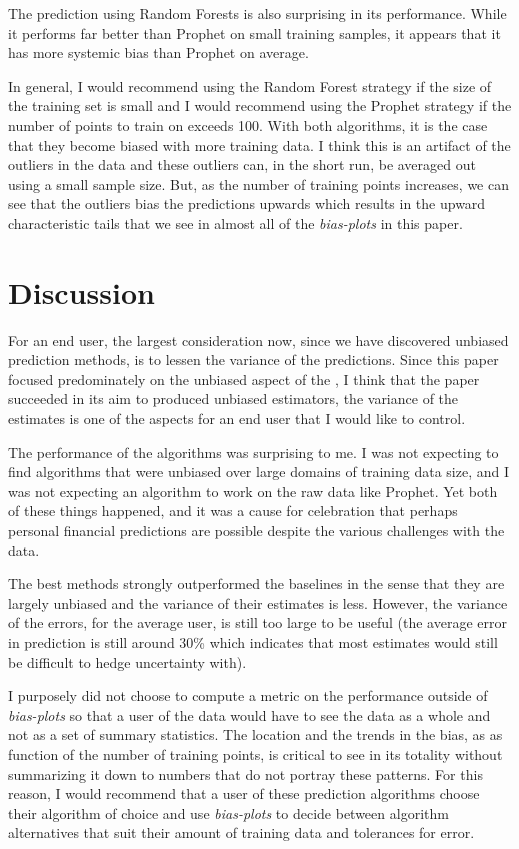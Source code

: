 \documentclass[11pt,a4paper]{article}
\newcommand{\bplots}{\textit{bias-plots}\xspace}
\begin{document}
The \yinyang prediction using Random Forests is also surprising in its performance. While it performs far better than Prophet on small training samples, it appears that it has more systemic bias than Prophet on average. 

In general, I would recommend using the \yinyang Random Forest strategy if the size of the training set is small and I would recommend using the Prophet strategy if the number of points to train on exceeds 100. With both algorithms, it is the case that they become biased with more training data. I think this is an artifact of the outliers in the data and these outliers can, in the short run, be averaged out using a small sample size. But, as the number of training points increases, we can see that the outliers bias the predictions upwards which results in the upward characteristic tails that we see in almost all of the \bplots in this paper. 




\section{Discussion}

For an end user, the largest consideration now, since we have discovered unbiased prediction methods, is to lessen the variance of the predictions. Since this paper focused predominately on the unbiased aspect of the \preprob, I think that the paper succeeded in its aim to produced unbiased estimators, the variance of the estimates is one of the aspects for an end user that I would like to control. 

The performance of the algorithms was surprising to me. I was not expecting to find algorithms that were unbiased over large domains of training data size, and I was not expecting an algorithm to work on the raw data like Prophet. Yet both of these things happened, and it was a cause for celebration that perhaps personal financial predictions are possible despite the various challenges with the data. 

The best methods strongly outperformed the baselines in the sense that they are largely unbiased and the variance of their estimates is less. However, the variance of the errors, for the average user, is still too large to be useful (the average error in prediction is still around 30\% which indicates that most estimates would still be difficult to hedge uncertainty with). 

I purposely did not choose to compute a metric on the performance outside of \bplots so that a user of the data would have to see the data as a whole and not as a set of summary statistics. The location and the trends in the bias, as as function of the number of training points, is critical to see in its totality without summarizing it down to numbers that do not portray these patterns. For this reason, I would recommend that a user of these prediction algorithms choose their algorithm of choice and use \bplots to decide between algorithm alternatives that suit their amount of training data and tolerances for error. 
\end{document}
